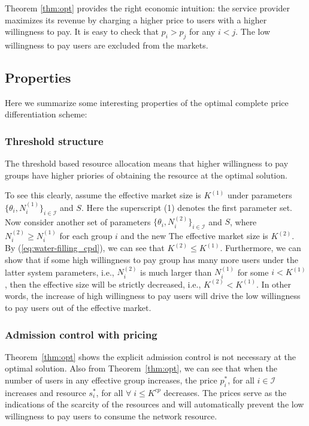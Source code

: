 \documentclass[twocolumn,10pt,twosided]{IEEEtran}
\begin{document}
Theorem \ref{thm:opt} provides the right economic intuition: the service provider maximizes its revenue by charging a higher price to users with a higher willingness to pay. It is easy to check that $p_i>p_j$ for any $i<j$. The low willingness to pay users are excluded from the markets.

\subsection{Properties}
\label{sub_sec:cpd}
Here we summarize some interesting properties of the optimal complete price differentiation scheme:
\subsubsection{Threshold structure} The threshold based resource allocation means that higher willingness to pay groups have higher priories of obtaining the resource at the optimal solution.


To see this clearly, assume the effective market size is $K^{(1)}$ under parameters $\{\theta_i,N_i^{(1)}\}_{i\in\mathcal{I}}$ and $S$.
Here the superscript (1) denotes the first parameter set.  Now consider another set of parameters $\{\theta_i,N_i^{(2)}\}_{i\in\mathcal{I}}$ and $S$, where $N_i^{(2)}\ge N_i^{(1)}$ for each group $i$ and the new  The effective market size is $K^{(2)}$. By (\ref{eq:water-filling_cpd}), we can see that $K^{(2)}\le K^{(1)}$. Furthermore, we can show that if some high willingness to pay group has many more users under the latter system parameters, i.e., $N_i^{(2)}$ is much larger than $N_i^{(1)}$ for some $i<K^{(1)}$, then the effective size will be strictly decreased, i.e., $K^{(2)}< K^{(1)}$. In other words, the increase of high willingness to pay users will drive the low willingness to pay users out of the effective market.



\subsubsection{Admission control with pricing} Theorem~\ref{thm:opt} shows the explicit admission control is not necessary  at the optimal solution. Also from Theorem~\ref{thm:opt}, we can see that when the number of users in any effective group increases, the price $p^*_i$, for all $i\in\mathcal{I}$ increases and resource $s^*_i$, for all $\forall\;i\le K^{cp}$ decreases. The prices serve as the indications of the scarcity of the resources and will automatically prevent the low willingness to pay users to consume the network resource.
\end{document}
